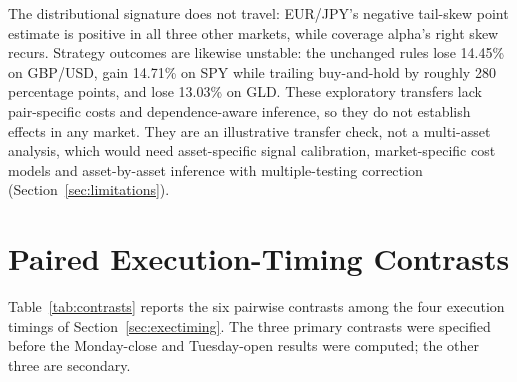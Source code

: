 \documentclass[11pt]{article}
\begin{document}
The distributional signature does not travel: EUR/JPY's negative tail-skew point estimate is positive in all three other markets, while coverage alpha's right skew recurs. Strategy outcomes are likewise unstable: the unchanged rules lose 14.45\% on GBP/USD, gain 14.71\% on SPY while trailing buy-and-hold by roughly 280 percentage points, and lose 13.03\% on GLD. These exploratory transfers lack pair-specific costs and dependence-aware inference, so they do not establish effects in any market. They are an illustrative transfer check, not a multi-asset analysis, which would need asset-specific signal calibration, market-specific cost models and asset-by-asset inference with multiple-testing correction (Section~\ref{sec:limitations}).

\section{Paired Execution-Timing Contrasts}
\label{appendix:contrasts}

Table~\ref{tab:contrasts} reports the six pairwise contrasts among the four execution timings of Section~\ref{sec:exectiming}. The three primary contrasts were specified before the Monday-close and Tuesday-open results were computed; the other three are secondary.
\end{document}
